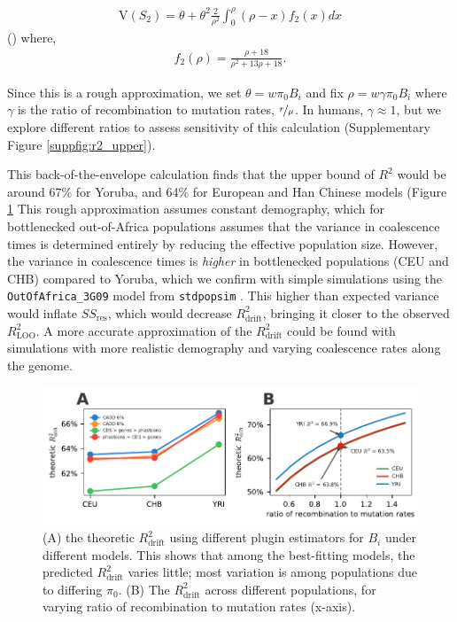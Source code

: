 \documentclass[11pt]{article}
\newcommand{\V}{\text{V}}
\newcommand{\V}{\text{V}}
\begin{document}
\begin{align}
    \V(S_2) = \theta + \theta^2 \frac{2}{\rho^2} \int_0^\rho (\rho - x) f_2(x) dx
\end{align}
(\cite[eq. 7.20]{Wakeley2009-ua}) where,
\begin{align}
    f_2(\rho) = \frac{\rho + 18}{\rho^2 + 13 \rho + 18}.
\end{align}

Since this is a rough approximation,  we set $\theta = w \pi_0 B_i$ and fix
$\rho = w \gamma \pi_0 B_i$ where $\gamma$ is the ratio of recombination to
mutation rates, $\nicefrac{r}{\mu}$. In humans, $\gamma \approx 1$, but we
explore different ratios to assess sensitivity of this calculation
(Supplementary Figure \ref{suppfig:r2_upper}). 

This back-of-the-envelope calculation finds that the upper bound of $R^2$ would
be around 67\% for Yoruba, and 64\% for European and Han Chinese models (Figure
\ref{suppfig:drift_r2} This rough approximation assumes constant demography,
which for bottlenecked out-of-Africa populations assumes that the variance in
coalescence times is determined entirely by reducing the effective population
size. However, the variance in coalescence times is \emph{higher} in
bottlenecked populations (CEU and CHB) compared to Yoruba, which we confirm
with simple simulations using the \texttt{OutOfAfrica\_3G09} model from
\texttt{stdpopsim} \parencite{Gutenkunst2009-pg,Adrion2020-cf}. This higher
than expected variance would inflate $SS_\text{res}$, which would decrease
$R_\text{drift}^2$, bringing it closer to the observed $R_\text{LOO}^2$. A more
accurate approximation of the $R_\text{drift}^2$ could be found with
simulations with more realistic demography and varying coalescence rates along
the genome.

\begin{figure}[htbp] \centering
    \includegraphics[width=\textwidth]{figures/supplementary/suppfigure_drift_R2.pdf}
    \caption{(A) the theoretic $R_\text{drift}^2$ using different plugin
        estimators for $B_i$ under different models. This shows that among the
        best-fitting models, the predicted $R_\text{drift}^2$ varies little;
        most variation is among populations due to differing $\pi_0$. (B) The 
        $R_\text{drift}^2$ across different populations, for varying ratio of recombination
        to mutation rates (x-axis).}
  \label{suppfig:drift_r2}
\end{figure}
\end{document}
